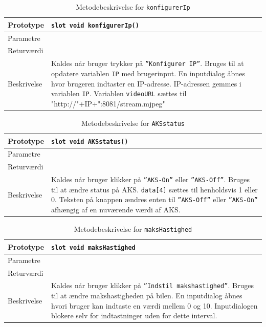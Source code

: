 \begin{table}[H]
\begin{tabularx}{\textwidth}{| L{2.5 cm} | Z |} \hline
Prototype & \texttt{slot void konfigurerIp()} \\\hline
Parametre &   \\\hline
Returværdi &  \\\hline
Beskrivelse & Kaldes når bruger trykker på \texttt{''Konfigurer IP''}. Bruges til at opdatere variablen \texttt{IP} med brugerinput. En inputdialog åbnes hvor brugeren indtaster en IP-adresse. IP-adressen gemmes i variablen \texttt{IP}. Variablen \texttt{videoURL} sættes til "http://"+IP+":8081/stream.mjpeg" \\\hline
\end{tabularx}
\caption{Metodebeskrivelse for \texttt{konfigurerIp}}
\label{table:met_konfigurerIp}
\end{table}

\begin{table}[H]
\begin{tabularx}{\textwidth}{| L{2.5 cm} | Z |} \hline
Prototype & \texttt{slot void AKSstatus()} \\\hline
Parametre &   \\\hline
Returværdi &  \\\hline
Beskrivelse & Kaldes når bruger klikker på \texttt{''AKS-On''} eller \texttt{''AKS-Off''}. Bruges til at ændre status på AKS. \texttt{data[4]} sættes til henholdsvis 1 eller 0. Teksten på knappen ændres enten til \texttt{''AKS-Off''} eller \texttt{''AKS-On''} afhængig af en nuværende værdi af AKS. \\\hline
\end{tabularx}
\caption{Metodebeskrivelse for \texttt{AKSstatus}}
\label{table:met_AKSstatus}
\end{table}

\begin{table}[H]
\begin{tabularx}{\textwidth}{| L{2.5 cm} | Z |} \hline
Prototype & \texttt{slot void maksHastighed} \\\hline
Parametre &   \\\hline
Returværdi &  \\\hline
Beskrivelse & Kaldes når bruger klikker på \texttt{''Indstil makshastighed''}. Bruges til at ændre makshastigheden på bilen. En inputdialog åbnes hvori bruger kan indtaste en værdi mellem 0 og 10. Inputdialogen blokere selv for indtastninger uden for dette interval.  \\\hline
\end{tabularx}
\caption{Metodebeskrivelse for \texttt{maksHastighed}}
\label{table:met_maksHastighed}
\end{table}


